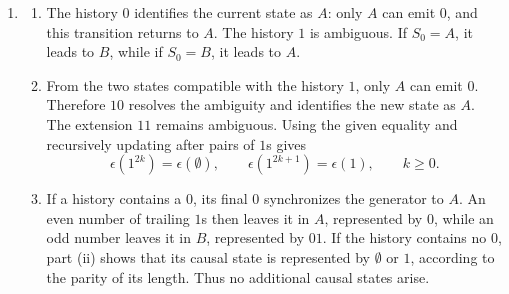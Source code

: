 \begin{solution}[ex:p2-3]
\begin{enumerate}
\begin{enumerate}
          \item Appending each possible symbol gives the causal-state update:
            \[
              \begin{array}{c|cc}
                \text{state} & 0 & 1\\
                \hline
                \epsilon(\emptyset) & \epsilon(0)  & \epsilon(1)\\
                \epsilon(0)         & \epsilon(00) & \epsilon(01)\\
                \epsilon(1)         & \epsilon(10) & \epsilon(11)\\
                \epsilon(10)        & \epsilon(00) & \epsilon(01)\\
                \epsilon(00)        & \text{--}    & \epsilon(01)\\
                \epsilon(01)        & \epsilon(11) & \epsilon(11)\\
                \epsilon(11)        & \epsilon(00) & \text{--}
              \end{array}
            \]
            Here a dash denotes an impossible extension. Drawing one node for
            each row and the indicated symbol-labelled edges gives the
            required automaton.
        \end{enumerate}

      \item
        \begin{enumerate}
          \item The history $0$ identifies the current state as $A$: only $A$
            can emit $0$, and this transition returns to $A$. The history $1$
            is ambiguous. If $S_0=A$, it leads to $B$, while if $S_0=B$, it
            leads to $A$.

          \item From the two states compatible with the history $1$, only $A$
            can emit $0$. Therefore $10$ resolves the ambiguity and identifies
            the new state as $A$. The extension $11$ remains ambiguous. Using
            the given equality and recursively updating after pairs of $1$s
            gives
            \[
              \epsilon(1^{2k})=\epsilon(\emptyset),
              \qquad
              \epsilon(1^{2k+1})=\epsilon(1),
              \qquad k\geq0.
            \]

          \item If a history contains a $0$, its final $0$ synchronizes the
            generator to $A$. An even number of trailing $1$s then leaves it
            in $A$, represented by $0$, while an odd number leaves it in $B$,
            represented by $01$. If the history contains no $0$, part (ii)
            shows that its causal state is represented by $\emptyset$ or $1$,
            according to the parity of its length. Thus no additional causal
            states arise.


\end{enumerate}
\end{enumerate}
\end{solution}
